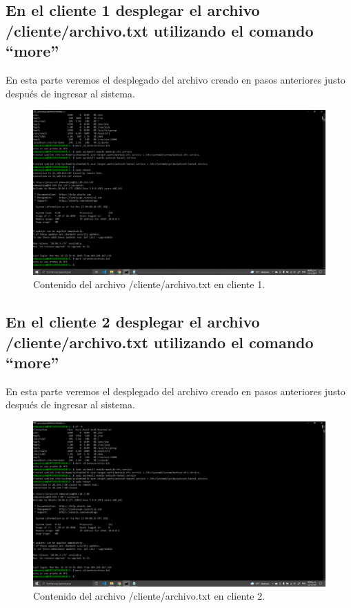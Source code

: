 \documentclass[11pt]{article}
\begin{document}
		\subsection{En el cliente 1 desplegar el archivo /cliente/archivo.txt utilizando el comando ``more''}
		En esta parte veremos el desplegado del archivo creado en pasos anteriores justo después de ingresar al sistema.
		\begin{figure}[H]
			\centering
			\includegraphics[scale=0.34]{resources/p10.png}
			\caption{Contenido del archivo /cliente/archivo.txt en cliente 1.}\label{fig:picture}
		\end{figure}	
		\subsection{En el cliente 2 desplegar el archivo /cliente/archivo.txt utilizando el comando ``more''}
		En esta parte veremos el desplegado del archivo creado en pasos anteriores justo después de ingresar al sistema.
		\begin{figure}[H]
			\centering
			\includegraphics[scale=0.34]{resources/p11.png}
			\caption{Contenido del archivo /cliente/archivo.txt en cliente 2.}\label{fig:picture}
		\end{figure}	
\end{document}
